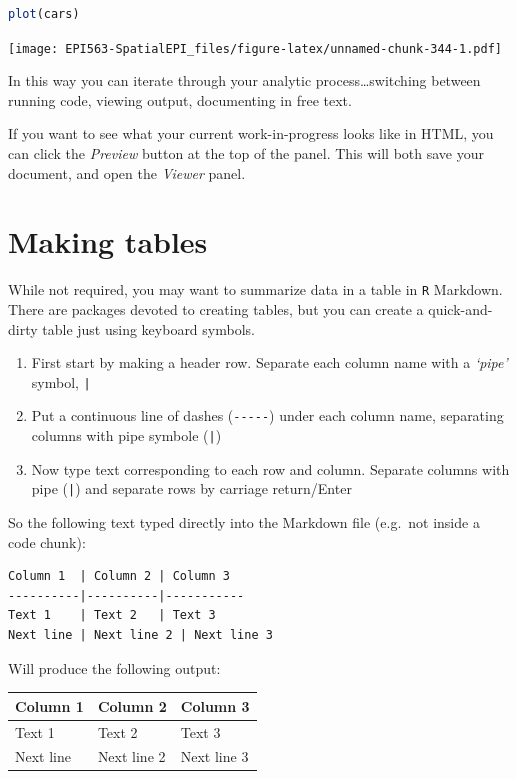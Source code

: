 \documentclass[
]{book}
\newcommand{\passthrough}[1]{#1}
\providecommand{\tightlist}{%
  \setlength{\itemsep}{0pt}\setlength{\parskip}{0pt}}
\begin{document}
\begin{lstlisting}[language=R]
plot(cars)
\end{lstlisting}

\texttt{[image: EPI563-SpatialEPI\_files/figure-latex/unnamed-chunk-344-1.pdf]}

In this way you can iterate through your analytic process\ldots switching between running code, viewing output, documenting in free text.

If you want to see what your current work-in-progress looks like in HTML, you can click the \emph{Preview} button at the top of the panel. This will both save your document, and open the \emph{Viewer} panel.

\hypertarget{making-tables}{%
\section*{Making tables}\label{making-tables}}

While not required, you may want to summarize data in a table in \passthrough{\lstinline!R!} Markdown. There are packages devoted to creating tables, but you can create a quick-and-dirty table just using keyboard symbols.

\begin{enumerate}
\def\labelenumi{\arabic{enumi}.}
\tightlist
\item
  First start by making a header row. Separate each column name with a \emph{`pipe'} symbol, \passthrough{\lstinline!|!}
\item
  Put a continuous line of dashes (\passthrough{\lstinline!-----!}) under each column name, separating columns with pipe symbole (\passthrough{\lstinline!|!})
\item
  Now type text corresponding to each row and column. Separate columns with pipe (\passthrough{\lstinline!|!}) and separate rows by carriage return/Enter
\end{enumerate}

So the following text typed directly into the Markdown file (e.g.~not inside a code chunk):

\begin{lstlisting}
Column 1  | Column 2 | Column 3
----------|----------|-----------
Text 1    | Text 2   | Text 3
Next line | Next line 2 | Next line 3
\end{lstlisting}

Will produce the following output:

\begin{longtable}[]{@{}lll@{}}
\toprule
Column 1 & Column 2 & Column 3\tabularnewline
\midrule
\endhead
Text 1 & Text 2 & Text 3\tabularnewline
Next line & Next line 2 & Next line 3\tabularnewline
\bottomrule
\end{longtable}
\end{document}
